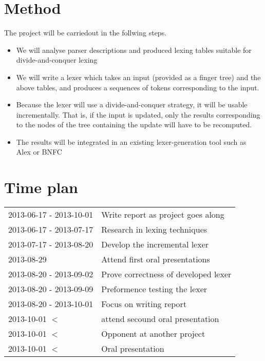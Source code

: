 \documentclass[11pt,a4paper]{article}
\begin{document}
\section{Method}
The project will be carriedout in the follwing steps.
\begin{itemize}
    \item 
        We will analyse parser descriptions and produced lexing tables suitable 
        for divide-and-conquer lexing
    \item 
        We will write a lexer which takes an input (provided as a finger tree)
        and the above tables, and produces a sequences of tokens corresponding
        to the input. 
    \item
        Because the lexer will use a divide-and-conquer strategy, it will be
        usable incrementally. That is, if the input is updated, only the results
        corresponding to the nodes of the tree containing the update will have
        to be recomputed.
    \item
        The results will be integrated in an existing lexer-generation tool such
        as Alex or BNFC
\end{itemize}

\section{Time plan}

\begin{tabular}{l l}
2013-06-17 - 2013-10-01 & Write report as project goes along\\
2013-06-17 - 2013-07-17 & Research in lexing techniques\\
2013-07-17 - 2013-08-20 & Develop the incremental lexer\\
2013-08-29 & Attend first oral presentations\\
2013-08-20 - 2013-09-02 & Prove correctness of developed lexer\\
2013-08-20 - 2013-09-09 & Preformence testing the lexer\\
2013-08-20 - 2013-10-01 & Focus on writing report\\
2013-10-01 $<$ & attend secound oral presentation\\
2013-10-01 $<$ & Opponent at another project\\
2013-10-01 $<$ & Oral presentation

\end{tabular}
\end{document}
